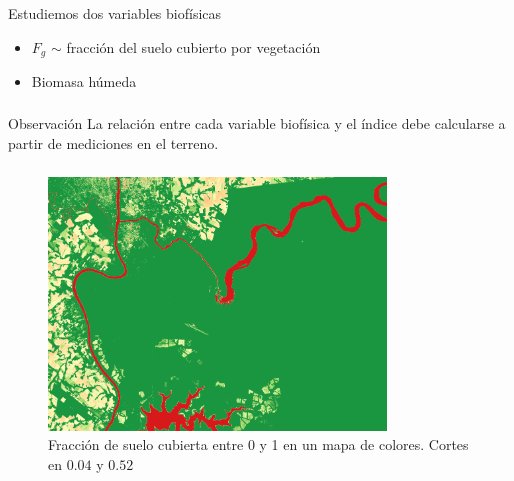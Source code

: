 \documentclass[]{beamer}
\begin{document}
\begin{frame}
    \frametitle{\subsecname}
    Estudiemos dos variables biofísicas
    \begin{itemize}[<+->]
        \item $F_g$ $\sim$ fracción del suelo cubierto por vegetación
        \item Biomasa húmeda
    \end{itemize}
\end{frame}

\begin{frame}
    \frametitle{\subsecname}
    \begin{block}{Observación}
        La relación entre cada variable biofísica y el índice debe
        calcularse a partir de mediciones en el terreno.
    \end{block}
\end{frame}

\begin{frame}
    \frametitle{\subsecname}
    \begin{figure}
    \begin{center}
        \includegraphics[width=0.8\textwidth]{imagenes/fg.png}
    \end{center}
    \caption{Fracción de suelo cubierta entre 0 y 1 en un mapa de colores.
        Cortes en $0.04$ y $0.52$}
    \end{figure}

\end{frame}
\end{document}

